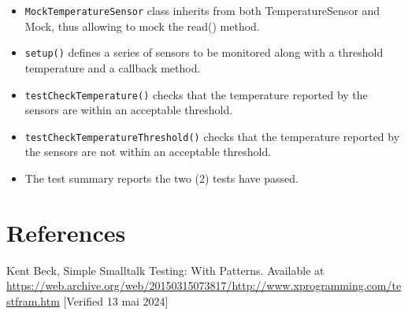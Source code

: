 \documentclass[letterpaper,12pt]{article}
\begin{document}
\begin{itemize}
   \item \texttt{MockTemperatureSensor} class inherits from both TemperatureSensor and Mock, thus allowing to mock the read() method.
   \item \texttt{setup()} defines a series of sensors to be monitored along with a threshold temperature and a callback method.
   \item \texttt{testCheckTemperature()} checks that the temperature reported by the sensors are within an acceptable threshold.
   \item \texttt{testCheckTemperatureThreshold()} checks that the temperature reported by the sensors are not within an acceptable threshold.
   \item The test summary reports the two (2) tests have passed.
\end{itemize}

\section*{References}

\noindent
[1] Kent Beck, Simple Smalltalk Testing: With Patterns. Available at \url{https://web.archive.org/web/20150315073817/http://www.xprogramming.com/testfram.htm} [Verified 13 mai 2024]
\end{document}
